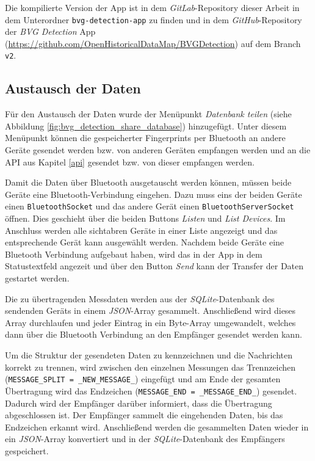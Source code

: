 Die kompilierte Version der App ist in dem \textit{GitLab}-Repository dieser Arbeit in dem Unterordner \texttt{bvg-detection-app} zu finden und in dem \textit{GitHub}-Repository der \textit{BVG Detection} App (\url{https://github.com/OpenHistoricalDataMap/BVGDetection}) auf dem Branch \texttt{v2}.

\subsection{Austausch der Daten}

Für den Austausch der Daten wurde der Menüpunkt \textit{Datenbank teilen} (siehe Abbildung \ref{fig:bvg_detection_share_database}) hinzugefügt. Unter diesem Menüpunkt können die gespeicherter Fingerprints per Bluetooth an andere Geräte gesendet werden bzw. von anderen Geräten empfangen werden und an die API aus Kapitel \ref{api} gesendet bzw. von dieser empfangen werden. 

Damit die Daten über Bluetooth ausgetauscht werden können, müssen beide Geräte eine Blue\-tooth-Verbindung eingehen. Dazu muss eins der beiden Geräte einen \texttt{BluetoothSocket} und das andere Gerät einen \texttt{BluetoothServerSocket} öffnen. Dies geschieht über die beiden Buttons \textit{Listen} und \textit{List Devices}. Im Anschluss werden alle sichtabren Geräte in einer Liste angezeigt und das entsprechende Gerät kann ausgewählt werden. Nachdem beide Geräte eine Bluetooth Verbindung aufgebaut haben, wird das in der App in dem Statustextfeld angezeit und über den Button \textit{Send} kann der Transfer der Daten gestartet werden.

Die zu übertragenden Messdaten werden aus der \textit{SQLite}-Datenbank des sendenden Geräts in einem \textit{JSON}-Array gesammelt. Anschließend wird dieses Array durchlaufen und jeder Eintrag in ein Byte-Array umgewandelt, welches dann über die Bluetooth Verbindung an den Empfänger gesendet werden kann.

Um die Struktur der gesendeten Daten zu kennzeichnen und die Nachrichten korrekt zu trennen, wird zwischen den einzelnen Messungen das Trennzeichen (\texttt{MESSAGE\_SPLIT \allowbreak = \allowbreak \grqq{}\_NEW\_MESSAGE\_\allowbreak \grqq{}}) eingefügt und am Ende der gesamten Übertragung wird das Endzeichen (\texttt{MESSAGE\_END \allowbreak = \allowbreak \grqq{}\_MESSAGE\_END\_\allowbreak \grqq{}}) gesendet. Dadurch wird der Empfänger darüber informiert, dass die Übertragung abgeschlossen ist. Der Empfänger sammelt die eingehenden Daten, bis das Endzeichen erkannt wird. Anschließend werden die gesammelten Daten wieder in ein \textit{JSON}-Array konvertiert und in der \textit{SQLite}-Datenbank des Empfängers gespeichert.

